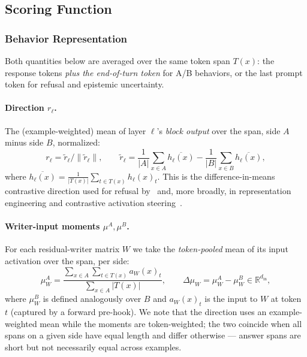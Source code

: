\subsection{Scoring Function}
\subsubsection{Behavior Representation}
Both quantities below are averaged over the same token span $T(x)$: the response tokens \emph{plus the end-of-turn token} for A/B behaviors, or the last prompt token for refusal and epistemic uncertainty.

\paragraph{Direction $r_\ell$.} The (example-weighted) mean of layer $\ell$'s \emph{block output} over the span, side $A$ minus side $B$, normalized:
\begin{equation}
  r_\ell=\tilde r_\ell/\lVert\tilde r_\ell\rVert,
  \qquad 
  \tilde r_\ell=\frac{1}{|A|}\sum_{x\in A}\overline{h_\ell(x)} - \frac{1}{|B|}\sum_{x\in B}\overline{h_\ell(x)},
\end{equation}
where $\overline{h_\ell(x)}=\frac{1}{|T(x)|}\sum_{t\in T(x)}h_\ell(x)_t$. This is the difference-in-means contrastive direction used for refusal by~\cite{arditi2024refusal} and, more broadly, in representation engineering and contrastive activation steering~\cite{zou2023repe,rimsky2024caa,marks2024geometry}.

\paragraph{Writer-input moments $\mu^{A},\mu^{B}$.} For each residual-writer matrix $W$ we take the
\emph{token-pooled} mean of its input activation over the span, per side:
\begin{equation}
  \mu^{A}_W=\frac{\sum_{x\in A}\sum_{t\in T(x)}a_W(x)_t}{\sum_{x\in A}|T(x)|},\qquad
  \Delta\mu_W=\mu^{A}_W-\mu^{B}_W\in\mathbb{R}^{d_{\text{in}}},
\end{equation}
where $\mu^{B}_W$ is defined analogously over $B$ and $a_W(x)_t$ is the input to $W$ at token $t$ (captured by a forward pre-hook). We note that the direction uses an example-weighted mean while the moments are token-weighted; the two coincide when all spans on a given side have equal length and differ otherwise --- answer spans are short but not necessarily equal across examples.

